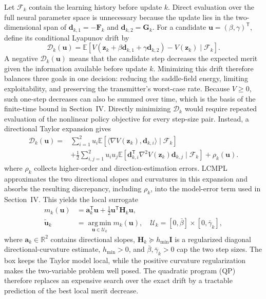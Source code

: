 \documentclass[conference]{IEEEtran}
\newcommand{\bF}{\bm{F}}
\newcommand{\bG}{\bm{G}}
\newcommand{\bz}{\bm{z}}
\newcommand{\bu}{\bm{u}}
\newcommand{\bd}{\bm{d}}
\newcommand{\ba}{\bm{a}}
\newcommand{\bH}{\bm{H}}
\newcommand{\E}{\mathbb{E}}
\begin{document}
Let $\mathcal F_k$ contain the learning history before update $k$.
Direct evaluation over the full neural parameter space is unnecessary because the update lies in the two-dimensional span of $\bd_{k,1}=-\bF_k$ and $\bd_{k,2}=\bG_k$.
For a candidate $\bu=(\beta,\gamma)^{\mathsf T}$, define its conditional Lyapunov drift by
\[
\mathcal D_k(\bu)=\E[V(\bz_k+\beta\bd_{k,1}+\gamma\bd_{k,2})-V(\bz_k)\mid\mathcal F_k].
\]
A negative $\mathcal D_k(\bu)$ means that the candidate step decreases the expected merit given the information available before update $k$.
Minimizing this drift therefore balances three goals in one decision: reducing the saddle-field energy, limiting exploitability, and preserving the transmitter's worst-case rate.
Because $V\geq0$, such one-step decreases can also be summed over time, which is the basis of the finite-time bound in Section~IV.
Directly minimizing $\mathcal D_k$ would require repeated evaluation of the nonlinear policy objective for every step-size pair.
Instead, a directional Taylor expansion gives
\[
\begin{aligned}
\mathcal D_k(\bu)
={}&\sum_{i=1}^{2}u_i\E[\langle\nabla V(\bz_k),\bd_{k,i}\rangle\mid\mathcal F_k]\\
&+\frac12\sum_{i,j=1}^{2}u_i u_j
\E[\bd_{k,i}^{\mathsf T}\nabla^2V(\bz_k)\bd_{k,j}\mid\mathcal F_k]
+\rho_k(\bu).
\end{aligned}
\]
where $\rho_k$ collects higher-order and direction-estimation errors.
LCMPL approximates the two directional slopes and curvatures in this expansion and absorbs the resulting discrepancy, including $\rho_k$, into the model-error term used in Section~IV.
This yields the local surrogate
\begin{equation}
\begin{aligned}
m_k(\bu)&=\ba_k^{\mathsf T}\bu+\tfrac12\bu^{\mathsf T}\bH_k\bu,\\
\widetilde{\bu}_k&=\operatorname*{arg\,min}_{\bu\in\mathcal U_k}m_k(\bu),
\quad
\mathcal U_k=[0,\bar\beta]\times[0,\bar\gamma_k],
\end{aligned}
\label{eq:boxqp}
\end{equation}
where $\ba_k\in\mathbb R^2$ contains directional slopes, $\bH_k\succeq h_{\min}\boldsymbol I$ is a regularized diagonal directional-curvature estimate, $h_{\min}>0$, and $\bar\beta,\bar\gamma_k>0$ cap the two step sizes.
The box keeps the Taylor model local, while the positive curvature regularization makes the two-variable problem well posed.
The quadratic program (QP) therefore replaces an expensive search over the exact drift by a tractable prediction of the best local merit decrease.
\end{document}

